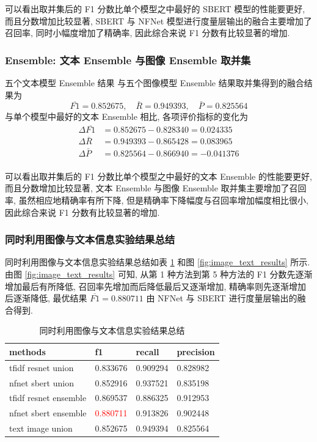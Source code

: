 \documentclass[12pt]{article}
\begin{document}
可以看出取并集后的 F1 分数比单个模型之中最好的 SBERT 模型的性能要更好, 而且分数增加比较显著, SBERT 与 NFNet 模型进行度量层输出的融合主要增加了召回率, 同时小幅度增加了精确率, 因此综合来说 F1 分数有比较显著的增加.

\subsubsection{Ensemble: 文本 Ensemble 与图像 Ensemble 取并集}

五个文本模型 Ensemble 结果 与五个图像模型 Ensemble 结果取并集得到的融合结果为
\begin{equation}
  \overline{F1}=0.852675,\quad\bar{R}=0.949393,\quad\bar{P}=0.825564
\end{equation}
与单个模型中最好的文本 Ensemble 相比, 各项评价指标的变化为
\begin{equation}
  \begin{aligned}
    \Delta\overline{F1}&=0.852675-0.828340=0.024335\\
    \Delta\bar{R}&=0.949393-0.865428=0.083965\\
    \Delta\bar{P}&=0.825564-0.866940=-0.041376\\
  \end{aligned}
\end{equation}

可以看出取并集后的 F1 分数比单个模型之中最好的文本 Ensemble 的性能要更好, 而且分数增加比较显著, 文本 Ensemble 与图像 Ensemble 取并集主要增加了召回率, 虽然相应地精确率有所下降, 但是精确率下降幅度与召回率增加幅度相比很小, 因此综合来说 F1 分数有比较显著的增加.

\subsubsection{同时利用图像与文本信息实验结果总结}

同时利用图像与文本信息实验结果总结如表 \ref{tab:image_text_results} 和图 \ref{fig:image_text_results} 所示. 由图 \ref{fig:image_text_results} 可知, 从第 1 种方法到第 5 种方法的 F1 分数先逐渐增加最后有所降低, 召回率先增加而后降低最后又逐渐增加, 精确率则先逐渐增加后逐渐降低, 最优结果 $\overline{F1}=0.880711$ 由 NFNet 与 SBERT 进行度量层输出的融合得到.

\begin{table}[htbp]
  \centering
  \caption{同时利用图像与文本信息实验结果总结}
  \label{tab:image_text_results}
  \begin{tabular}{llll}
    \toprule
    methods & f1       & recall   & precision \\
    \midrule
    tfidf resnet union    & 0.833676 & 0.909294 & 0.828982  \\
    nfnet sbert union     & 0.852916 & 0.937521 & 0.835198  \\
    tfidf resnet ensemble & 0.869537 & 0.886325 & 0.912953  \\
    nfnet sbert ensemble  & \textcolor{red}{0.880711} & 0.913826 & 0.902448  \\
    text image union      & 0.852675 & 0.949394 & 0.825564  \\
    \bottomrule
  \end{tabular}
\end{table}
\end{document}
